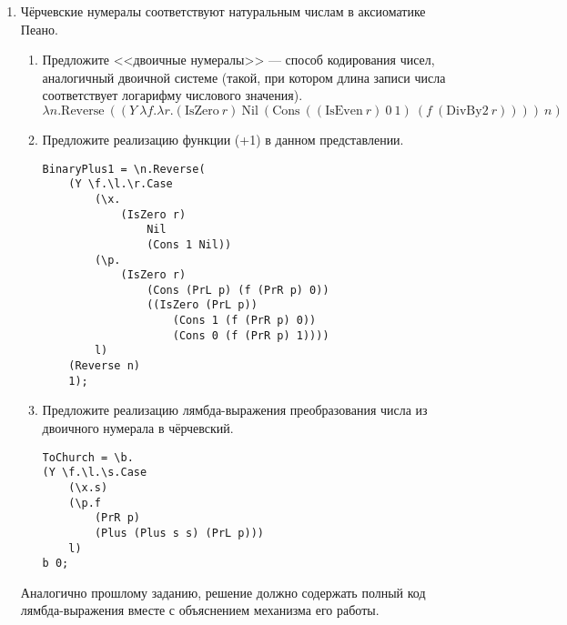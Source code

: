 \begin{enumerate}
    \item Чёрчевские нумералы соответствуют натуральным числам в аксиоматике Пеано.
          \begin{enumerate}
              \item Предложите <<двоичные нумералы>> --- способ кодирования чисел, аналогичный двоичной системе
                    (такой, при котором длина записи числа соответствует логарифму числового значения).
                    \[\lambda n.\mathrm{Reverse}\ ((Y\ \lambda f.\lambda r.(\mathrm{IsZero}\ r)\ \mathrm{Nil}\ (\mathrm{Cons}\ ((\mathrm{IsEven}\ r)\ 0\ 1)\ (f\ (\mathrm{DivBy2}\ r))))\ n)\]
              \item Предложите реализацию функции (+1) в данном представлении.
                    \begin{verbatim}
BinaryPlus1 = \n.Reverse(
    (Y \f.\l.\r.Case 
        (\x.
            (IsZero r)
                Nil
                (Cons 1 Nil))
        (\p.
            (IsZero r)
                (Cons (PrL p) (f (PrR p) 0))
                ((IsZero (PrL p))
                    (Cons 1 (f (PrR p) 0))
                    (Cons 0 (f (PrR p) 1))))
        l)
    (Reverse n)
    1);
                    \end{verbatim}
              \item Предложите реализацию лямбда-выражения преобразования числа из двоичного нумерала в чёрчевский.
                    \begin{verbatim}
ToChurch = \b.
(Y \f.\l.\s.Case
    (\x.s)
    (\p.f
        (PrR p)
        (Plus (Plus s s) (PrL p)))
    l)
b 0;
                    \end{verbatim}
          \end{enumerate}

          Аналогично прошлому заданию, решение должно содержать полный код лямбда-выражения вместе с объяснением механизма его работы.

\end{enumerate}


